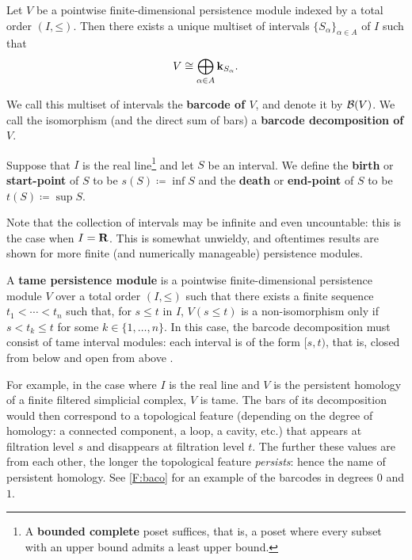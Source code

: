 \begin{theorem}
\label{T:barcode-decomposition}
  Let $V$ be a pointwise finite-dimensional persistence module indexed by a total order $(I, \mathord{\leq})$. Then there exists a unique multiset of intervals $\{S_\alpha\}_{\alpha \in A}$ of $I$ such that
  \[
    V \cong \bigoplus_{\alpha \in A} \mathbf{k}_{S_\alpha}.
  \]
\end{theorem}

\begin{definition}
\label{!D:barcode-decomposition}
  We call this multiset of intervals the \textbf{barcode of $V$}, and denote it by $\mathcal{B}(V)$. We call the isomorphism (and the direct sum of bars) a \textbf{barcode decomposition of $V$}.
  
  Suppose that $I$ is the real line\footnote{A \textbf{bounded complete} poset suffices, that is, a poset where every subset with an upper bound admits a least upper bound.} and let $S$ be an interval. We define the \textbf{birth} or \textbf{start-point} of $S$ to be $s(S) \coloneq \inf S$ and the \textbf{death} or \textbf{end-point} of $S$ to be $t(S) \coloneq \sup S$.
\end{definition}

Note that the collection of intervals may be infinite and even uncountable: this is the case when $I = \mathbf{R}$. This is somewhat unwieldy, and oftentimes results are shown for more finite (and numerically manageable) persistence modules.

\begin{definition}
\label{!D:tame}
  A \textbf{tame persistence module} is a pointwise finite-dimensional persistence module $V$ over a total order $(I, \mathord{\leq})$ such that there exists a finite sequence $t_1 < \cdots < t_n$ such that, for $s \leq t$ in $I$, $V(s \leq t)$ is a non-isomorphism only if $s < t_k \leq t$ for some $k \in \{1, \ldots, n\}$. In this case, the barcode decomposition must consist of tame interval modules: each interval is of the form $[s, t)$, that is, closed from below and open from above \cite{ZomorodianCarlsson2005}.
\end{definition}

\begin{example}
  For example, in the case where $I$ is the real line and $V$ is the persistent homology of a finite filtered simplicial complex, $V$ is tame. The bars of its decomposition would then correspond to a topological feature (depending on the degree of homology: a connected component, a loop, a cavity, etc.) that appears at filtration level $s$ and disappears at filtration level $t$. The further these values are from each other, the longer the topological feature \textit{persists}: hence the name of persistent homology.
  See \cref{F:baco} for an example of the barcodes in degrees $0$ and $1$.
\end{example}

